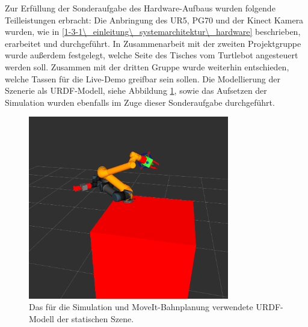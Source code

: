 Zur Erfüllung der Sonderaufgabe des Hardware-Aufbaus wurden folgende Teilleistungen erbracht:
\newline
Die Anbringung des UR5, PG70 und der Kinect Kamera wurden, wie in \ref{1-3-1\_einleitung\_systemarchitektur\_hardware} beschrieben, erarbeitet und durchgeführt. In Zusammenarbeit mit der zweiten Projektgruppe wurde außerdem festgelegt, welche Seite des Tisches vom Turtlebot angesteuert werden soll. Zusammen mit der dritten Gruppe wurde weiterhin entschieden, welche Tassen für die Live-Demo greifbar sein sollen. Die Modellierung der Szenerie als URDF-Modell, siehe Abbildung \ref{urdfModell}, sowie das Aufsetzen der Simulation wurden ebenfalls im Zuge dieser Sonderaufgabe durchgeführt.
\begin{figure}
	\centering
	\includegraphics[height=8cm]{images/Modell.png}
	\caption{Das für die Simulation und MoveIt-Bahnplanung verwendete URDF-Modell der statischen Szene.}
	\label{urdfModell}
\end{figure}
